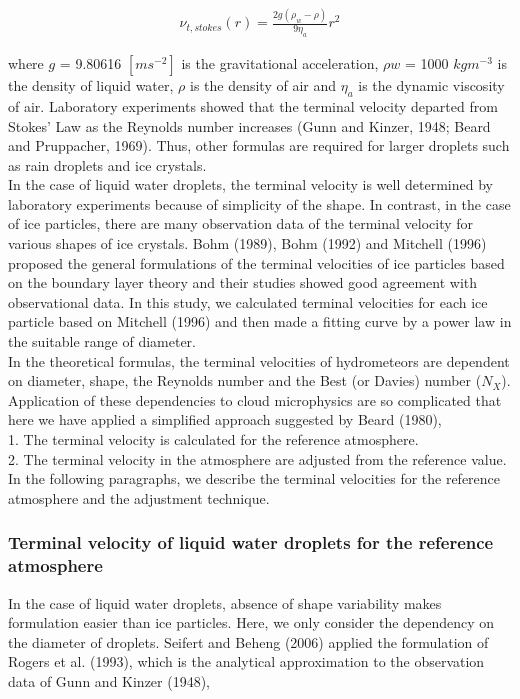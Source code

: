 \begin{eqnarray}
\nu_{t,stokes}(r)=\frac{2g(\rho_{w}-\rho)}{9\eta_{a}}r^{2}
\label{sn12}
\end{eqnarray}

where $g$ = 9.80616 $[m s^{-2}]$ is the gravitational acceleration, $\rho w$ = 1000 $kg m^{-3}$ is the density of liquid water, $\rho$ is the density of air and $\eta_{a}$ is the dynamic viscosity of air. Laboratory experiments showed that the terminal velocity departed from Stokes’ Law as the Reynolds number increases (Gunn and Kinzer, 1948; Beard and Pruppacher, 1969). Thus, other formulas are required for larger droplets such as rain droplets and ice crystals.\\
In the case of liquid water droplets, the terminal velocity is well determined by laboratory experiments because of simplicity of the shape. In contrast, in the case of ice particles, there are many observation data of the terminal velocity for various shapes of ice crystals. Bohm (1989), Bohm (1992) and Mitchell (1996) proposed the general formulations of the terminal velocities of ice particles based on the boundary layer theory and their studies showed good agreement with observational data. In this study, we calculated terminal velocities for each ice particle based on Mitchell (1996) and then made a fitting curve by a power law in the suitable range of diameter. \\
In the theoretical formulas, the terminal velocities of hydrometeors are dependent on diameter, shape, the Reynolds number and the Best (or Davies) number ($N_{X}$). Application of these dependencies to cloud microphysics are so complicated that here we have applied a simplified approach suggested by Beard (1980),\\
1. The terminal velocity is calculated for the reference atmosphere.\\
2. The terminal velocity in the atmosphere are adjusted from the reference value.\\
In the following paragraphs, we describe the terminal velocities for the reference atmosphere and the adjustment technique.

\subsubsection{Terminal velocity of liquid water droplets for the reference atmosphere}
In the case of liquid water droplets, absence of shape variability makes formulation easier than ice particles. Here, we only consider the dependency on the diameter of droplets. Seifert and Beheng (2006) applied the formulation of Rogers et al. (1993), which is the analytical approximation to the observation data of Gunn and Kinzer (1948),

